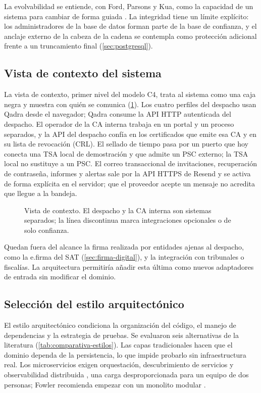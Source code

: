 La evolvabilidad se entiende, con Ford, Parsons y Kua, como la capacidad de un sistema para cambiar de forma guiada \cite{ford2023}. La integridad tiene un límite explícito: los administradores de la base de datos forman parte de la base de confianza, y el anclaje externo de la cabeza de la cadena se contempla como protección adicional frente a un truncamiento final (\cref{sec:postgresql}).

\subsection{Vista de contexto del sistema}\label{sec:vista-contexto}

La vista de contexto, primer nivel del modelo C4, trata al sistema como una caja negra y muestra con quién se comunica (\cref{fig:contexto}). Los cuatro perfiles del despacho usan Qadra desde el navegador; Qadra consume la API HTTP autenticada del despacho. El operador de la CA interna trabaja en un portal y un proceso separados, y la API del despacho confía en los certificados que emite esa CA y en su lista de revocación (CRL). El sellado de tiempo pasa por un puerto que hoy conecta una TSA local de demostración y que admite un PSC externo; la TSA local no sustituye a un PSC. El correo transaccional de invitaciones, recuperación de contraseña, informes y alertas sale por la API HTTPS de Resend y se activa de forma explícita en el servidor; que el proveedor acepte un mensaje no acredita que llegue a la bandeja.

\begin{figure}[tbp]
  \centering
  
  \caption{Vista de contexto. El despacho y la CA interna son sistemas separados; la línea discontinua marca integraciones opcionales o de solo confianza.}
  \label{fig:contexto}
\end{figure}

Quedan fuera del alcance la firma realizada por entidades ajenas al despacho, como la e.firma del SAT (\cref{sec:firma-digital}), y la integración con tribunales o fiscalías. La arquitectura permitiría añadir esta última como nuevos adaptadores de entrada sin modificar el dominio.

\subsection{Selección del estilo arquitectónico}\label{sec:estilo-arquitectonico}

El estilo arquitectónico condiciona la organización del código, el manejo de dependencias y la estrategia de pruebas. Se evaluaron seis alternativas de la literatura (\cref{tab:comparativa-estilos}). Las capas tradicionales hacen que el dominio dependa de la persistencia, lo que impide probarlo sin infraestructura real. Los microservicios exigen orquestación, descubrimiento de servicios y observabilidad distribuida \cite{newman2021}, una carga desproporcionada para un equipo de dos personas; Fowler recomienda empezar con un monolito modular \cite{fowler2015}.

